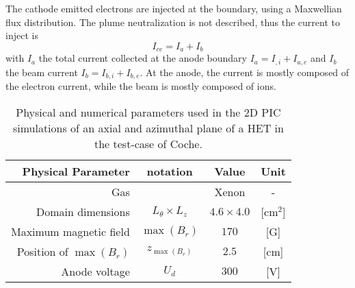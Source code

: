  The cathode emitted electrons are injected at the boundary, using a Maxwellian flux distribution.
  The plume neutralization is not described, thus the current to inject is
  \begin{equation} \label{eq-coche_Ice}
    I_{ce } = I_a + I_b
  \end{equation}
  with $I_a$ the total current collected at the anode boundary $I_a = I_{, i} + I_{a, e}$ and $I_b$ the beam current $I_{b} = I_{b, i} + I_{b, e}$. 
  At the anode, the current is mostly composed of the electron current, while the beam is mostly composed of ions.
  
  \begin{table}[htb] %
       \centering
       \caption{\label{tab-parameters-coche} Physical and numerical parameters used in the \ac{2D} \ac{PIC} simulations of an axial and azimuthal \ztheta plane of a \ac{HET} in the test-case of Coche.}
       \begin{tabular}{@{}r c c c@{}} 
          \toprule
          {\bf Physical Parameter} & notation & Value & Unit \\
          \midrule
          Gas & & Xenon & - \\
          Domain dimensions & $L_{\theta} \times L_{z}$ & $4.6 \times 4.0$ & [cm$^2$] \\
          Maximum magnetic field & $\max(B_{r})$                    & $170$                 & [{G}] \\
          Position of  $\max(B_{r})$   & $z_{\max(B_{r})}$                    & $2.5$      & [cm] \\
          Anode voltage & $U_d$                    & $300$     & [V] \\


\end{tabular}
\end{table}
